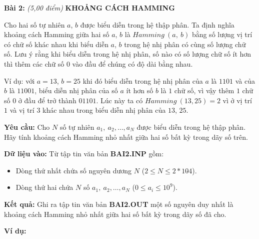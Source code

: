 \documentclass[
]{article}
\begin{document}
\textbf{Bài 2:} \emph{(5,00 điểm)} \textbf{KHOẢNG CÁCH HAMMING}

Cho hai số tự nhiên \(a\), \(b\) được biểu diễn trong hệ thập phân. Ta
định nghĩa khoảng cách Hamming giữa hai số \(a\), \(b\) là
\(Hamming\ (a,\ b)\) bằng số lượng vị trí có chữ số khác nhau khi biểu
diễn \(a\), \(b\) trong hệ nhị phân có cùng số lượng chữ số. Lưu ý rằng
khi biểu diễn trong hệ nhị phân, số nào có số lượng chữ số ít hơn thì
thêm các chữ số \(0\) vào đầu để chúng có độ dài bằng nhau.

Ví dụ: với \(a = 13\), \(b = 25\) khi đó biểu diễn trong hệ nhị phân của
\(a\) là \(1101\) và của \(b\) là \(11001\), biểu diễn nhị phân của số
\(a\) ít hơn số \(b\) là \(1\) chữ số, vì vậy thêm \(1\) chữ số \(0\) ở
đầu để trở thành \(01101\). Lúc này ta có \(Hamming\ (13,25) = 2\) vì ở
vị trí \(1\) và vị trí \(3\) khác nhau trong biểu diễn nhị phân của
\(13\), \(25\).

\textbf{Yêu cầu:} Cho \(N\) số tự nhiên \(a_{1},\ a_{2},\ldots,a_{N}\)
được biểu diễn trong hệ thập phân. Hãy tính khoảng cách Hamming nhỏ nhất
giữa hai số bất kỳ trong dãy số trên.

\textbf{Dữ liệu vào:} Từ tập tin văn bản \textbf{BAI2.INP} gồm:

\begin{itemize}
\item
  Dòng thứ nhất chứa số nguyên dương \(N\)
  (\(2 \leq N \leq 2*10\hat{}4\)).
\item
  Dòng thứ hai chứa \(N\) số \(a_{1},\ a_{2},\ldots,a_{N}\)
  (\(0 \leq a_{i} \leq 10^{9}\)).
\end{itemize}

\textbf{Kết quả:} Ghi ra tập tin văn bản \textbf{BAI2.OUT} một số nguyên
duy nhất là khoảng cách Hamming nhỏ nhất giữa hai số bất kỳ trong dãy số
đã cho.

\textbf{Ví dụ:}
\end{document}
